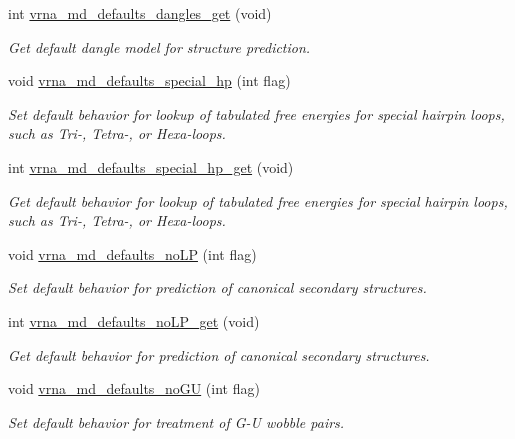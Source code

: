 \begin{DoxyCompactItemize}
int \mbox{\hyperlink{group__model__details_ga67ca06f95ae133778c79a4493c9817b8}{vrna\+\_\+md\+\_\+defaults\+\_\+dangles\+\_\+get}} (void)
\begin{DoxyCompactList}\small\item\em Get default dangle model for structure prediction. \end{DoxyCompactList}\item 
void \mbox{\hyperlink{group__model__details_gafff6449a02744add0308e653230c15fc}{vrna\+\_\+md\+\_\+defaults\+\_\+special\+\_\+hp}} (int flag)
\begin{DoxyCompactList}\small\item\em Set default behavior for lookup of tabulated free energies for special hairpin loops, such as Tri-\/, Tetra-\/, or Hexa-\/loops. \end{DoxyCompactList}\item 
int \mbox{\hyperlink{group__model__details_ga1d68a6efdaa1253cc63fd9cd06452559}{vrna\+\_\+md\+\_\+defaults\+\_\+special\+\_\+hp\+\_\+get}} (void)
\begin{DoxyCompactList}\small\item\em Get default behavior for lookup of tabulated free energies for special hairpin loops, such as Tri-\/, Tetra-\/, or Hexa-\/loops. \end{DoxyCompactList}\item 
void \mbox{\hyperlink{group__model__details_ga2f88ffc393ac9d7987849c965fd29ea8}{vrna\+\_\+md\+\_\+defaults\+\_\+no\+LP}} (int flag)
\begin{DoxyCompactList}\small\item\em Set default behavior for prediction of canonical secondary structures. \end{DoxyCompactList}\item 
int \mbox{\hyperlink{group__model__details_ga934344888fbacaed538bbbfe910f2aa6}{vrna\+\_\+md\+\_\+defaults\+\_\+no\+L\+P\+\_\+get}} (void)
\begin{DoxyCompactList}\small\item\em Get default behavior for prediction of canonical secondary structures. \end{DoxyCompactList}\item 
void \mbox{\hyperlink{group__model__details_ga98218f85c7a957a1d1ddf4627fdf5a39}{vrna\+\_\+md\+\_\+defaults\+\_\+no\+GU}} (int flag)
\begin{DoxyCompactList}\small\item\em Set default behavior for treatment of G-\/U wobble pairs. \end{DoxyCompactList}\item 

\end{DoxyCompactItemize}
